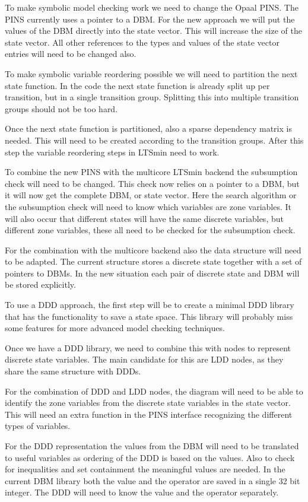 To make symbolic model checking work we need to change the Opaal PINS. The PINS currently uses a pointer to a DBM. For the new approach we will put the values of the DBM directly into the state vector. This will increase the size of the state vector. All other references to the types and values of the state vector entries will need to be changed also. 

To make symbolic variable reordering possible we will need to partition the next state function. In the code the next state function is already split up per transition, but in a single transition group. Splitting this into multiple transition groups should not be too hard.

Once the next state function is partitioned, also a sparse dependency matrix is needed. This will need to be created according to the transition groups. After this step the variable reordering steps in LTSmin need to work.

To combine the new PINS with the multicore LTSmin backend the subsumption check will need to be changed. This check now relies on a pointer to a DBM, but it will now get the complete DBM, or state vector. Here the search algorithm or the subsumption check will need to know which variables are zone variables. It will also occur that different states will have the same discrete variables, but different zone variables, these all need to be checked for the subsumption check.

For the combination with the multicore backend also the data structure will need to be adapted. The current structure stores a discrete state together with a set of pointers to DBMs. In the new situation each pair of discrete state and DBM will be stored explicitly.

To use a DDD approach, the first step will be to create a minimal DDD library that has the functionality to save a state space. This library will probably miss some features for more advanced model checking techniques.

Once we have a DDD library, we need to combine this with nodes to represent discrete state variables. The main candidate for this are LDD nodes, as they share the same structure with DDDs.

For the combination of DDD and LDD nodes, the diagram will need to be able to identify the zone variables from the discrete state variables in the state vector. This will need an extra function in the PINS interface recognizing the different types of variables.  

For the DDD representation the values from the DBM will need to be translated to useful variables as ordering of the DDD is based on the values. Also to check for inequalities and set containment the meaningful values are needed. In the current DBM library both the value and the operator are saved in a single 32 bit integer. The DDD will need to know the value and the operator separately.

